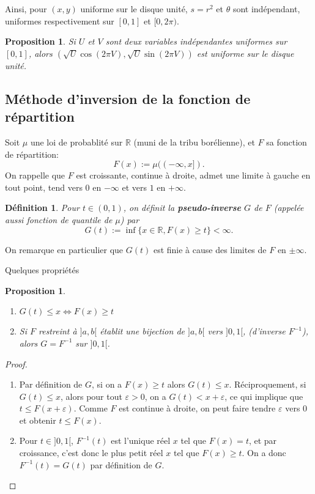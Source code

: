 \documentclass[a4paper,12pt]{book}
\newtheorem{defnfr}[thmfr]{Définition}
\newtheorem{propfr}[thmfr]{Proposition}
\begin{document}
Ainsi, pour $(x, y)$ uniforme sur le disque unit\'e, $s = r^2$ et $\theta$ sont ind\'ependant, uniformes respectivement sur $[0,1]$ et $[0, 2 \pi)$.

\begin{propfr}
Si $U$ et $V$ sont deux variables ind\'ependantes uniformes sur $[0,1]$, alors
$(\sqrt{U} \cos(2 \pi V), \sqrt{U} \sin(2 \pi V))$ est uniforme sur le disque unit\'e.
\end{propfr}

\subsection{Méthode d'inversion de la fonction de répartition}
Soit $\mu$ une loi de probablit\'e sur $\mathbb{R}$ (muni de la tribu bor\'elienne), et $F$ sa fonction de r\'epartition:
$$F(x) :=  \mu( (-\infty, x]).$$
On rappelle que $F$ est croissante, continue \`a droite, admet une limite \`a gauche
en tout point,
tend vers $0$ en $-\infty$ et vers $1$ en $+\infty$.

\begin{defnfr}
Pour $t \in (0,1)$, on définit la \textbf{pseudo-inverse} $G$ de $F$ (appelée aussi fonction de quantile de $\mu$) par
$$G(t):= \inf \{x \in \mathbb{R},
F(x) \geq t\}<\infty.$$
\end{defnfr}
On remarque en particulier que $G(t)$ est finie \`a cause des limites de $F$ en $\pm \infty$.

Quelques propriétés
\begin{propfr}
\begin{enumerate}
\item $G(t)\leq x \Leftrightarrow F(x)\geq t$
\item Si $F$ restreint à $]a,b[$ établit une bijection de $]a,b[$ vers $]0,1[$, (d'inverse $F^{-1}$), alors $G=F^{-1}$ sur $]0,1[$.
\end{enumerate}
\end{propfr}

\begin{proof}
\begin{enumerate}
\item Par définition de $G$, si on a $F(x)\geq t$ alors $G(t)\leq x$. Réciproquement, si $G(t)\leq x$, alors pour tout $\varepsilon >0$, on a $G(t)< x+\varepsilon$, ce qui implique que $t\leq F(x+\varepsilon)$. Comme $F$ est continue à droite, on peut faire tendre $\varepsilon$ vers $0$ et obtenir $t\leq F(x)$.
\item Pour $t\in ]0,1[$, $F^{-1}(t)$ est l'unique réel $x$ tel que $F(x)=t$, et par croissance, c'est donc le plus petit réel $x$ tel que $F(x)\geq t$. On a donc $F^{-1}(t)=G(t)$ par définition de $G$.
\end{enumerate}
\end{proof}
\end{document}
